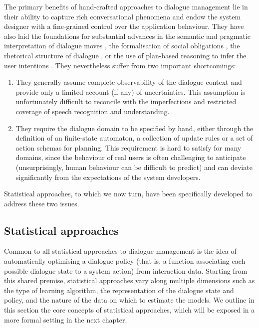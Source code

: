 The primary benefits of hand-crafted approaches to dialogue management lie in their ability to capture rich conversational phenomena and endow the system designer with a fine-grained control over the application behaviour.  They have also laid the foundations for substantial advances in the semantic and pragmatic interpretation of dialogue moves \citep{ThomasonManuscript-THOEUA,Ginzburg2012}, the formalisation of social obligations \citep{Traum:1994}, the rhetorical structure of dialogue \citep{0521659515}, or the use of plan-based reasoning to infer the user intentions \citep{Allen1980,Litman87}.  They nevertheless suffer from two important shortcomings: \begin{enumerate}
\item They generally assume complete observability of the dialogue context and provide only a limited account (if any) of uncertainties. This assumption is unfortunately difficult to reconcile with the imperfections and restricted coverage of speech recognition and understanding.
\item They require the dialogue domain to be specified by hand, either through the definition of an finite-state automaton, a collection of update rules or a set of action schemas for planning.  This requirement is hard to satisfy for many domains, since the behaviour of real users is often challenging to anticipate (unsurprisingly, human behaviour can be difficult to predict) and can deviate significantly from the expectations of the system developers. 
\end{enumerate}

Statistical approaches, to which we now turn, have been specifically developed to address these two issues.

\subsection{Statistical approaches}
\label{sec:statistical}

Common to all statistical approaches to dialogue management is the idea of automatically optimising a dialogue policy (that is, a function associating each possible dialogue state to a system action) from interaction data.  Starting from this shared premise, statistical approaches vary along multiple dimensions such as the type of learning algorithm, the representation of the dialogue state and policy, and the nature of the data on which to estimate the models. We outline in this section the core concepts of statistical approaches, which will be exposed in a more formal setting in the next chapter. 

